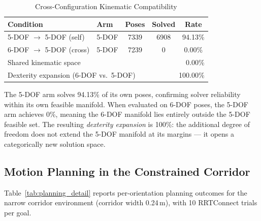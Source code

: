 \documentclass[conference]{IEEEtran}
\begin{document}
	\begin{table}[t]
		\centering
		\caption{Cross-Configuration Kinematic Compatibility}
		\label{tab:cross_config}
		\renewcommand{\arraystretch}{1.2}
		\small
		\begin{tabular}{llccc}
			\toprule
			\textbf{Condition} & \textbf{Arm} & \textbf{Poses} & \textbf{Solved} & \textbf{Rate} \\
			\midrule
			5-DOF $\rightarrow$ 5-DOF (self)  & 5-DOF & 7339 & 6908 & 94.13\% \\
			6-DOF $\rightarrow$ 5-DOF (cross) & 5-DOF & 7239 &    0 &  0.00\% \\
			\midrule
			\multicolumn{3}{l}{Shared kinematic space}                  & \multicolumn{2}{r}{0.00\%}   \\
			\multicolumn{3}{l}{Dexterity expansion (6-DOF vs.\ 5-DOF)} & \multicolumn{2}{r}{100.00\%} \\
			\bottomrule
		\end{tabular}
	\end{table}
	
	The 5-DOF arm solves 94.13\% of its own poses, confirming solver
	reliability within its own feasible manifold. When evaluated on 6-DOF
	poses, the 5-DOF arm achieves 0\%, meaning the 6-DOF manifold lies
	entirely outside the 5-DOF feasible set. The resulting
	\textit{dexterity expansion} is 100\%: the additional degree of
	freedom does not extend the 5-DOF manifold at its margins --- it
	opens a categorically new solution space.
	
	\subsection{Motion Planning in the Constrained Corridor}
	
	Table~\ref{tab:planning_detail} reports per-orientation planning
	outcomes for the narrow corridor environment (corridor width 0.24\,m),
	with 10 RRTConnect trials per goal.
	
\end{document}
